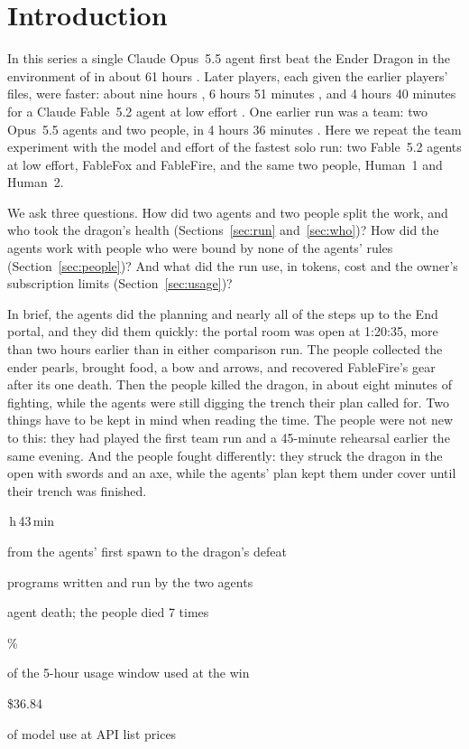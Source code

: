 \documentclass[11pt,a4paper]{article}
\newcommand{\statcell}[2]{%
  \begin{minipage}[t]{0.177\textwidth}\raggedright
    {\sffamily\fontsize{17}{20}\selectfont #1\par}\vspace{3pt}
    {\sffamily\fontsize{7}{8.6}\selectfont\color{inkgrey}#2\par}
  \end{minipage}}
\newcommand{\statsep}{\hspace{0.5em}{\color{rulegrey}\vrule width 0.6pt}\hspace{0.6em}}
\begin{document}
\clearpage
\section{Introduction}

In this series a single Claude Opus~5.5 agent first beat the Ender Dragon in the environment of \citet{faldor2026team} in about 61 hours \citep{batsuk2026single}. Later players, each given the earlier players' files, were faster: about nine hours \citep{batsuk2026second}, 6 hours 51 minutes \citep{batsuk2026fourth}, and 4 hours 40 minutes for a Claude Fable~5.2 agent at low effort \citep{batsuk2026fifth}. One earlier run was a team: two Opus~5.5 agents and two people, in 4 hours 36 minutes \citep{batsuk2026team}. Here we repeat the team experiment with the model and effort of the fastest solo run: two Fable~5.2 agents at low effort, FableFox and FableFire, and the same two people, Human~1 and Human~2.

We ask three questions. How did two agents and two people split the work, and who took the dragon's health (Sections~\ref{sec:run} and~\ref{sec:who})? How did the agents work with people who were bound by none of the agents' rules (Section~\ref{sec:people})? And what did the run use, in tokens, cost and the owner's subscription limits (Section~\ref{sec:usage})?

In brief, the agents did the planning and nearly all of the steps up to the End portal, and they did them quickly: the portal room was open at 1:20:35, more than two hours earlier than in either comparison run. The people collected the ender pearls, brought food, a bow and arrows, and recovered FableFire's gear after its one death. Then the people killed the dragon, in about eight minutes of fighting, while the agents were still digging the trench their plan called for. Two things have to be kept in mind when reading the time. The people were not new to this: they had played the first team run and a 45-minute rehearsal earlier the same evening. And the people fought differently: they struck the dragon in the open with swords and an axe, while the agents' plan kept them under cover until their trench was finished.

\vspace{10pt}
\noindent\statcell{1\,h\,43\,min}{from the agents' first spawn to the dragon's defeat}%
\statsep\statcell{176}{programs written and run by the two agents}%
\statsep\statcell{1}{agent death; the people died 7 times}%
\statsep\statcell{82\%}{of the 5-hour usage window used at the win}%
\statsep\statcell{\$36.84}{of model use at API list prices}
\vspace{6pt}
\end{document}
